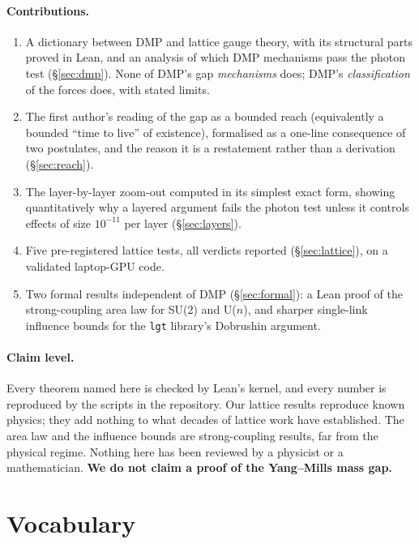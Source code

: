 \documentclass[11pt,a4paper]{article}
\begin{document}
\paragraph{Contributions.}
\begin{enumerate}[nosep,leftmargin=*]
\item A dictionary between DMP and lattice gauge theory, with its structural parts proved in Lean, and an analysis of which DMP mechanisms
      pass the photon test (\S\ref{sec:dmp}). None of DMP's gap \emph{mechanisms} does; DMP's \emph{classification} of the forces does, with
      stated limits.
\item The first author's reading of the gap as a bounded reach (equivalently a bounded ``time to live'' of existence), formalised as a
      one-line consequence of two postulates, and the reason it is a restatement rather than a derivation (\S\ref{sec:reach}).
\item The layer-by-layer zoom-out computed in its simplest exact form, showing quantitatively why a layered argument fails the photon
      test unless it controls effects of size $10^{-11}$ per layer (\S\ref{sec:layers}).
\item Five pre-registered lattice tests, all verdicts reported (\S\ref{sec:lattice}), on a validated laptop-GPU code.
\item Two formal results independent of DMP (\S\ref{sec:formal}): a Lean proof of the strong-coupling area law for SU(2) and U($n$), and
      sharper single-link influence bounds for the \texttt{lgt} library's Dobrushin argument.
\end{enumerate}

\paragraph{Claim level.} Every theorem named here is checked by Lean's kernel, and every number is reproduced by the scripts in the
repository. Our lattice results reproduce known physics; they add nothing to what decades of lattice work have established. The area law
and the influence bounds are strong-coupling results, far from the physical regime. Nothing here has been reviewed by a physicist or a
mathematician. \textbf{We do not claim a proof of the Yang--Mills mass gap.}

\section{Vocabulary}\label{sec:vocab}
\end{document}
